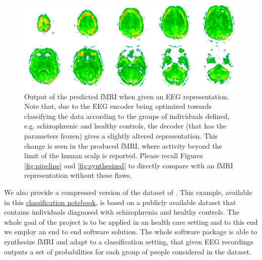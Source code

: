 \begin{figure}[t]
    \centering
    \includegraphics[width=\textwidth]{figures/discriminative.png}
    \caption{Output of the predicted fMRI when given an EEG representation. Note that, due to the EEG encoder being optimized towards classifying the data according to the groups of individuals defined, e.g. schizophrenic and healthy controls, the decoder (that has the parameters frozen) gives a slightly altered representation. This change is seen in the produced fMRI, where activity beyond the limit of the human scalp is reported. Please recall Figures \ref{fig:pipeline} and \ref{fig:synthesized} to directly compare with an fMRI representation without these flaws.}
    \label{fig:discriminative}
\end{figure}
We also provide a compressed version of the dataset of \citep{dataset2022fribourg}. This example, available in this \href{https://github.com/eeg-to-fmri/eeg-to-fmri/blob/main/examples/classification_contrastive.ipynb}{classification notebook}, is based on a publicly available dataset that contains individuals diagnosed with schizophrenia and healthy controls. The whole goal of the project is to be applied in an health care setting and to this end we employ an end to end software solution. The whole software package is able to synthesize fMRI and adapt to a classification setting, that given EEG recordings outputs a set of probabilities for each group of people considered in the dataset.



